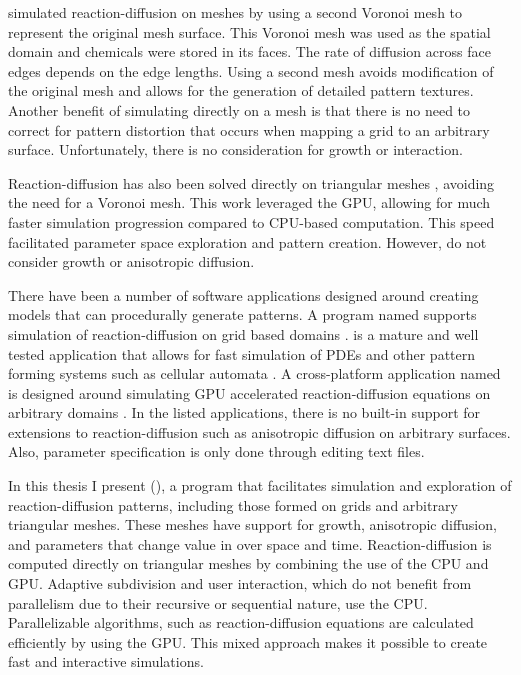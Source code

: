 \citet{turk1991} simulated reaction-diffusion on meshes by using a second Voronoi mesh to represent the original mesh surface. This Voronoi mesh was used as the spatial domain and chemicals were stored in its faces. The rate of diffusion across face edges depends on the edge lengths. Using a second mesh avoids modification of the original mesh and allows for the generation of detailed pattern textures. Another benefit of simulating directly on a mesh is that there is no need to correct for pattern distortion that occurs when mapping a grid to an arbitrary surface. Unfortunately, there is no consideration for growth or interaction. %

Reaction-diffusion has also been solved directly on triangular meshes \citep{descombes2016}, avoiding the need for a Voronoi mesh. This work leveraged the GPU, allowing for much faster simulation progression compared to CPU-based computation. This speed facilitated parameter space exploration and pattern creation. However, \citet{descombes2016} do not consider growth or anisotropic diffusion.

There have been a number of software applications designed around creating models that can procedurally generate patterns. A program named  supports simulation of reaction-diffusion on grid based domains \citep{texrd2019}.  is a mature and well tested application that allows for fast simulation of PDEs and other pattern forming systems such as cellular automata \citep{netlogo1999}. A cross-platform application named  is designed around simulating GPU accelerated reaction-diffusion equations on arbitrary domains \citep{ready2012}. In the listed applications, there is no built-in support for extensions to reaction-diffusion such as anisotropic diffusion on arbitrary surfaces. Also, parameter specification is only done through editing text files.

In this thesis I present  (\ProgramName{}), a program that facilitates simulation and exploration of reaction-diffusion patterns, including those formed on grids and arbitrary triangular meshes. These meshes have support for growth, anisotropic diffusion, and parameters that change value in over space and time. Reaction-diffusion is computed directly on triangular meshes by combining the use of the CPU and GPU. Adaptive subdivision and user interaction, which do not benefit from parallelism due to their recursive or sequential nature, use the CPU. Parallelizable algorithms, such as reaction-diffusion equations are calculated efficiently by using the GPU. This mixed approach makes it possible to create fast and interactive simulations. 

